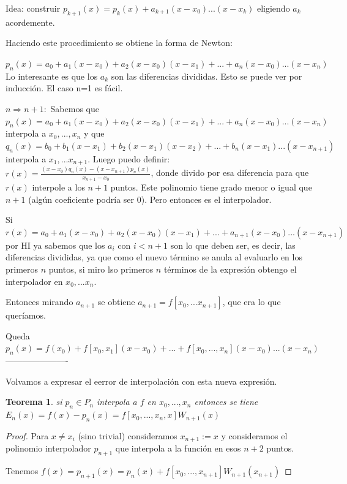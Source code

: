 \documentclass[10pt,a4paper,final]{report}
\newtheorem{theorem}{Teorema}
\begin{document}
{Idea: construir $p_{k+1}(x) = p_k(x) + a_{k+1}(x-x_0)...(x-x_k)$ eligiendo $a_k$ acordemente.

Haciendo este procedimiento se obtiene la forma de Newton:

$p_n(x) = a_0 + a_1 (x-x_0) + a_2 (x-x_0)(x-x_1) + ... + a_n(x-x_0)...(x-x_n)$ \\

Lo interesante es que los $a_k$ son las diferencias divididas. Esto se puede ver por inducción. El caso n=1 es fácil.

$n\Rightarrow n+1: $ Sabemos que $p_n(x) = a_0 + a_1 (x-x_0) + a_2 (x-x_0)(x-x_1) + ... + a_n(x-x_0)...(x-x_n) $ interpola a $x_0,...,x_n$ y que 
$q_n(x) = b_0 + b_1 (x-x_1) + b_2 (x-x_1)(x-x_2) + ... + b_n(x-x_1)...(x-x_{n+1}) $ interpola a $x_1,...x_{n+1}$. Luego puedo definir:\\

$r(x) = \frac{(x-x_0) q_n(x) - (x-x_{n+1}) p_n(x)}{x_{n+1} - x_0}$, donde divido por esa diferencia para que $r(x)$ interpole a los $n+1$ puntos. Este polinomio tiene grado menor o igual  que $n+1$ (algún coeficiente podría ser 0). Pero entonces es el interpolador.

Si $r(x) = a_0 + a_1 (x-x_0) + a_2 (x-x_0)(x-x_1) + ... + a_{n+1}(x-x_0)...(x-x_{n+1})$ por HI ya sabemos que los $a_i$ con $i < n+1$ son lo que deben ser, es decir, las diferencias divididas, ya que como el nuevo término se anula al evaluarlo en los primeros $n$ puntos, si miro lso primeros $n$ términos de la expresión obtengo el interpolador en $x_0,...x_n$.

Entonces mirando $a_{n+1}$ se obtiene $a_{n+1}= f[x_0,...x_{n+1}]$, que era lo que queríamos.

Queda $p_n(x) = f(x_0) + f[x_0,x_1] (x-x_0) + ... + f[x_0,...,x_n] (x-x_0)...(x-x_n)$
----------------------

Volvamos a expresar el eerror de interpolación con esta nueva expresión.

\begin{theorem}si $p_n \in P_n$ interpola a $f$ en $x_0,...,x_n$ entonces se tiene $E_n(x) = f(x) - p_n(x) = f[x_0,...,x_n,x] W_{n+1}(x)$
\end{theorem}

\begin{proof} Para $x \neq x_i$ (sino trivial) consideramos $x_{n+1}:=x$ y consideramos el polinomio interpolador $p_{n+1}$ que interpola a la función en esos $n+2$ puntos.

Tenemos $f(x) = p_{n+1}(x) = p_n(x) + f[x_0,...,x_{n+1}]W_{n+1}(x_{n+1})$


\end{proof}}
\end{document}
